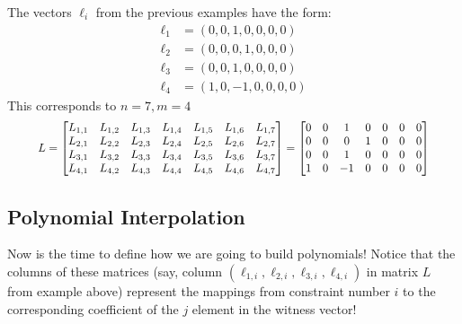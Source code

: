 \documentclass[../lecture-notes-148x210.tex]{subfiles}
\begin{document}
\begin{example}
    The vectors $\boldsymbol{\ell}_i$ from the previous examples have the form:
    \begin{align*}
        \boldsymbol{\ell}_1 &= (0, 0, 1, 0, 0, 0, 0) \\
        \boldsymbol{\ell}_2 &= (0, 0, 0, 1, 0, 0, 0) \\
        \boldsymbol{\ell}_3 &= (0, 0, 1, 0, 0, 0, 0) \\
        \boldsymbol{\ell}_4 &= (1, 0, -1, 0, 0, 0, 0)
    \end{align*}
    This corresponds to $n = 7, m = 4$
    \begin{equation*}
        \scalebox{0.9}{$
        L = \begin{bmatrix}
            L_{1,1} & L_{1,2} & L_{1,3} & L_{1,4} & L_{1,5} & L_{1,6} & L_{1,7} \\
            L_{2,1} & L_{2,2} & L_{2,3} & L_{2,4} & L_{2,5} & L_{2,6} & L_{2,7} \\
            L_{3,1} & L_{3,2} & L_{3,3} & L_{3,4} & L_{3,5} & L_{3,6} & L_{3,7} \\
            L_{4,1} & L_{4,2} & L_{4,3} & L_{4,4} & L_{4,5} & L_{4,6} & L_{4,7}
        \end{bmatrix} = \begin{bmatrix}
            0 & 0 & 1 & 0 & 0 & 0 & 0 \\
            0 & 0 & 0 & 1 & 0 & 0 & 0 \\
            0 & 0 & 1 & 0 & 0 & 0 & 0 \\
            1 & 0 & -1 & 0 & 0 & 0 & 0 
        \end{bmatrix}
        $}
    \end{equation*}
\end{example}

\subsection{Polynomial Interpolation}

Now is the time to define how we are going to build polynomials! Notice that the
columns of these matrices (say, column $(\ell_{1,i},\ell_{2,i},\ell_{3,i},\ell_{4,i})$ in
matrix $L$ from example above) represent the mappings from constraint number $i$
to the corresponding coefficient of the $j$ element in the witness vector!
\end{document}
